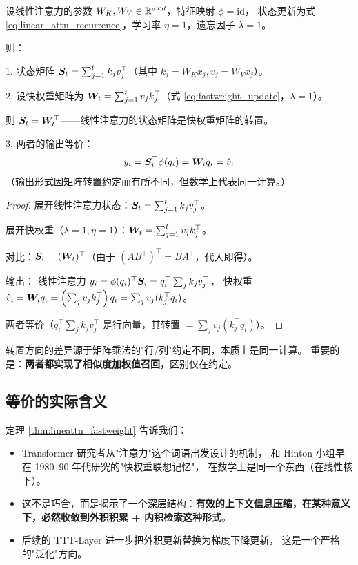 \begin{theorem}
\label{thm:lineattn_fastweight}

设线性注意力的参数 $W_K, W_V \in \mathbb{R}^{d \times d}$，特征映射 $\phi = \text{id}$，
状态更新为式 \eqref{eq:linear_attn_recurrence}，学习率 $\eta = 1$，遗忘因子 $\lambda = 1$。

则：

1. 状态矩阵 $\boldsymbol{S}_t = \sum_{j=1}^t k_j v_j^\top$（其中 $k_j = W_K x_j, v_j = W_V x_j$）。

2. 设快权重矩阵为 $\boldsymbol{W}_t = \sum_{j=1}^t v_j k_j^\top$（式 \eqref{eq:fastweight_update}，$\lambda=1$）。

则 $\boldsymbol{S}_t = \boldsymbol{W}_t^\top$——线性注意力的状态矩阵是快权重矩阵的转置。

3. 两者的输出等价：
\begin{equation}
  y_i = \boldsymbol{S}_i^\top \phi(q_i) = \boldsymbol{W}_i q_i = \hat{v}_i
  \label{eq:equiv}
\end{equation}
（输出形式因矩阵转置约定而有所不同，但数学上代表同一计算。）
\end{theorem}

\begin{proof}
展开线性注意力状态：$\boldsymbol{S}_t = \sum_{j=1}^t k_j v_j^\top$。

展开快权重（$\lambda=1, \eta=1$）：$\boldsymbol{W}_t = \sum_{j=1}^t v_j k_j^\top$。

对比：$\boldsymbol{S}_t = (\boldsymbol{W}_t)^\top$（由于 $(A B^\top)^\top = B A^\top$，代入即得）。

输出：
线性注意力 $y_i = \phi(q_i)^\top \boldsymbol{S}_i = q_i^\top \sum_{j} k_j v_j^\top$，
快权重 $\hat{v}_i = \boldsymbol{W}_i q_i = \left(\sum_j v_j k_j^\top\right) q_i = \sum_j v_j (k_j^\top q_i)$。

两者等价（$q_i^\top \sum_j k_j v_j^\top$ 是行向量，其转置 $= \sum_j v_j (k_j^\top q_i)$）。
\end{proof}

\begin{remark}
转置方向的差异源于矩阵乘法的"行/列"约定不同，本质上是同一计算。
重要的是：\textbf{两者都实现了相似度加权值召回}，区别仅在约定。
\end{remark}

\subsection*{等价的实际含义}

定理 \ref{thm:lineattn_fastweight} 告诉我们：
\begin{itemize}
  \item Transformer 研究者从"注意力"这个词语出发设计的机制，
        和 Hinton 小组早在 1980--90 年代研究的"快权重联想记忆"，
        在数学上是同一个东西（在线性核下）。
  \item 这不是巧合，而是揭示了一个深层结构：\textbf{有效的上下文信息压缩，在某种意义下，必然收敛到外积积累 + 内积检索这种形式}。
  \item 后续的 TTT-Layer 进一步把外积更新替换为梯度下降更新，
        这是一个严格的"泛化"方向。
\end{itemize}

